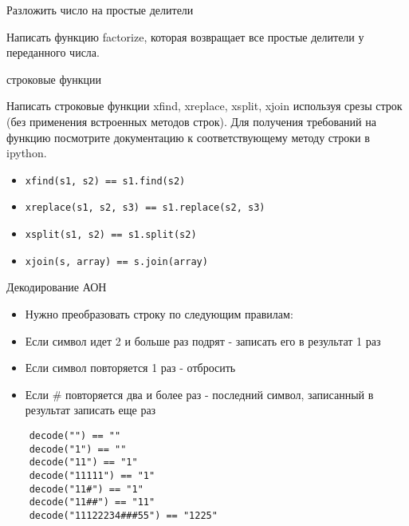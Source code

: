 \documentclass{article}
\begin{document}
\begin{center} Разложить число на простые делители \end{center}
Написать функцию factorize, которая возвращает все простые делители
у переданного числа.
\newpage

\begin{center} строковые функции \end{center}
Написать строковые функции xfind, xreplace, xsplit, xjoin используя
срезы строк (без применения встроенных методов строк).
Для получения требований на функцию посмотрите документацию к соответствующему
методу строки в ipython.
\begin{itemize}
    \item \lstinline!xfind(s1, s2) == s1.find(s2)!
    \item \lstinline!xreplace(s1, s2, s3) == s1.replace(s2, s3)!
    \item \lstinline!xsplit(s1, s2) == s1.split(s2)!
    \item \lstinline!xjoin(s, array) == s.join(array)!
\end{itemize}
\newpage

\begin{center} Декодирование АОН \end{center}
\begin{itemize}
    \item Нужно преобразовать строку по следующим правилам:
    \item Если символ идет 2 и больше раз подрят - записать его в результат 1 раз
    \item Если символ повторяется 1 раз - отбросить
    \item Если \# повторяется два и более раз - последний символ, записанный в результат записать еще раз
\end{itemize}
\begin{lstlisting}
    decode("") == ""
    decode("1") == ""
    decode("11") == "1"
    decode("11111") == "1"
    decode("11#") == "1"
    decode("11##") == "11"
    decode("11122234###55") == "1225"
\end{lstlisting}
\newpage
\end{document}
